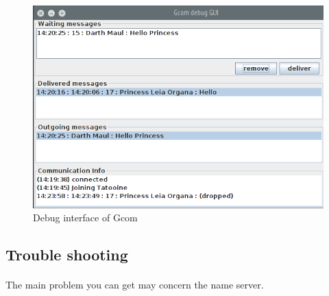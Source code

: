 
	
\begin{figure}[h]
    \begin{center}
        \includegraphics[scale=0.5]{figures/debug_window.png}
    \end{center}
    \caption{Debug interface of Gcom}
    \label{fig:debugGui}
\end{figure}

\subsection{Trouble shooting}
\paragraph{}{
    The main problem you can get may concern the name server.
}

